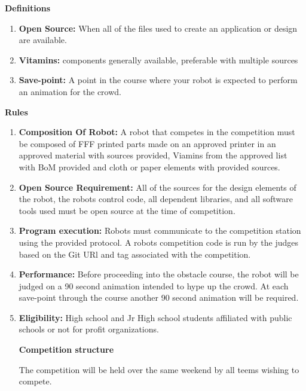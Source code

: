 \documentclass{article}
\begin{document}
 \pagebreak
 
{\huge \textbf{Definitions}}
\begin{enumerate}
	\item \textbf{Open Source:} When all of the files used to create an application or design are available.
	\item \textbf{Vitamins:} components generally available, preferable with multiple sources
	\item \textbf{Save-point:} A point in the course where your robot is expected to perform an animation for the crowd.  
\end{enumerate}

  \pagebreak
{\huge \textbf{Rules}}

\begin{enumerate}
	
\item \textbf{Composition Of Robot:} A robot that competes in the competition must be composed of FFF printed parts made on an approved printer in an approved material with sources provided, Viamins from the approved list with BoM provided and cloth or paper elements with provided sources. 

\item \textbf{Open Source Requirement:} All of the sources for the design elements of the robot, the robots control code, all dependent libraries, and all software tools used must be open source at the time of competition. 

\item \textbf{Program execution:} Robots must communicate to the competition station using the provided protocol. A robots competition code is run by the judges based on the Git URl and tag associated with the competition. 


\item \textbf{Performance:} Before proceeding into the obstacle course, the robot will be judged on a 90 second animation intended to hype up the crowd. At each save-point through the course another 90 second animation will be required. 

\item \textbf{Eligibility:} High school and Jr High school students affiliated with public schools or not for profit organizations. 

 \pagebreak

{\huge \textbf{Competition structure}}

The competition will be held over the same weekend by all teems wishing to compete. 


\end{enumerate}
\end{document}
